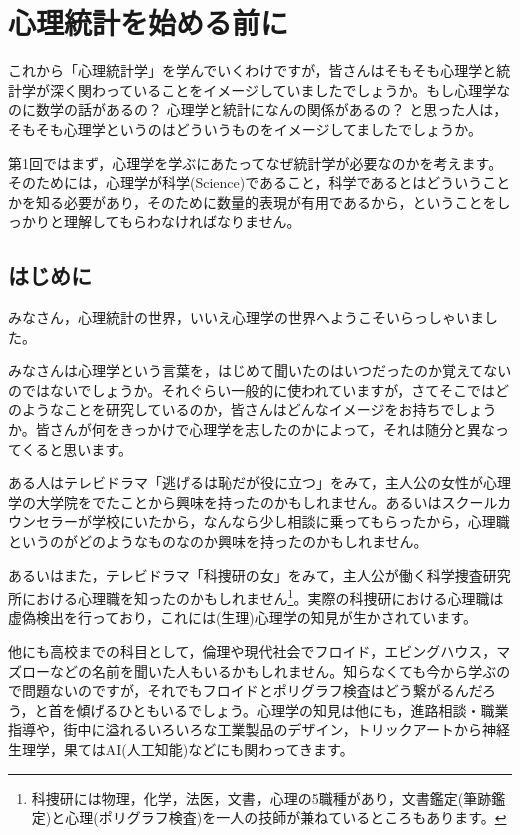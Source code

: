 \documentclass{ltjsbook}
\begin{document}
\chapter{心理統計を始める前に}
\label{b01_introduction}
これから「心理統計学」を学んでいくわけですが，皆さんはそもそも心理学と統計学が深く関わっていることをイメージしていましたでしょうか。もし心理学なのに数学の話があるの？ 心理学と統計になんの関係があるの？ と思った人は，そもそも心理学というのはどういうものをイメージしてましたでしょうか。

第1回ではまず，心理学を学ぶにあたってなぜ統計学が必要なのかを考えます。そのためには，心理学が科学(Science)であること，科学であるとはどういうことかを知る必要があり，そのために数量的表現が有用であるから，ということをしっかりと理解してもらわなければなりません。

\section{はじめに}

みなさん，心理統計の世界，いいえ心理学の世界へようこそいらっしゃいました。

みなさんは心理学という言葉を，はじめて聞いたのはいつだったのか覚えてないのではないでしょうか。それぐらい一般的に使われていますが，さてそこではどのようなことを研究しているのか，皆さんはどんなイメージをお持ちでしょうか。皆さんが何をきっかけで心理学を志したのかによって，それは随分と異なってくると思います。

ある人はテレビドラマ「逃げるは恥だが役に立つ」をみて，主人公の女性が心理学の大学院をでたことから興味を持ったのかもしれません。あるいはスクールカウンセラーが学校にいたから，なんなら少し相談に乗ってもらったから，心理職というのがどのようなものなのか興味を持ったのかもしれません。

あるいはまた，テレビドラマ「科捜研の女」をみて，主人公が働く科学捜査研究所における心理職を知ったのかもしれません\footnote{科捜研には物理，化学，法医，文書，心理の5職種があり，文書鑑定(筆跡鑑定)と心理(ポリグラフ検査)を一人の技師が兼ねているところもあります。}。実際の科捜研における心理職は虚偽検出を行っており，これには(生理)心理学の知見が生かされています。

他にも高校までの科目として，倫理や現代社会でフロイド，エビングハウス，マズローなどの名前を聞いた人もいるかもしれません。知らなくても今から学ぶので問題ないのですが，それでもフロイドとポリグラフ検査はどう繋がるんだろう，と首を傾げるひともいるでしょう。心理学の知見は他にも，進路相談・職業指導や，街中に溢れるいろいろな工業製品のデザイン，トリックアートから神経生理学，果てはAI(人工知能)などにも関わってきます。
\end{document}
